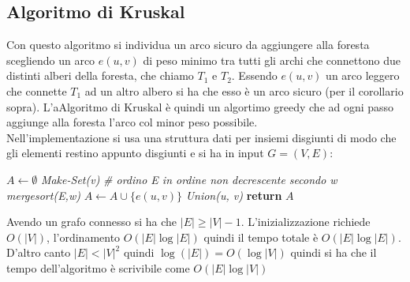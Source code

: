 \documentclass[a4paper,12pt, oneside]{book}
\begin{document}
\subsection{Algoritmo di Kruskal}
Con questo algoritmo si individua un arco sicuro da aggiungere alla
foresta scegliendo un arco $e(u,v)$ di peso minimo tra tutti gli archi
che connettono due distinti alberi della foresta, che chiamo $T_1$ e
$T_2$. Essendo $e(u,v)$ un arco leggero che connette $T_1$ ad un altro
albero si ha che esso è un arco sicuro (per il corollario
sopra). L'aAlgoritmo di Kruskal è quindi un algortimo greedy che ad
ogni passo aggiunge alla foresta l'arco col minor peso
possibile.\\
Nell'implementazione si usa una struttura dati per insiemi
disgiunti di modo che gli elementi restino appunto disgiunti e si ha
in input $G=(V,E)$:
\begin{algorithm}
  \begin{algorithmic}
    \State $A\gets \emptyset$
    \State \textit{Make-Set(v)}
    \EndFor
    \State \textit{\# ordino E in ordine non decrescente secondo w}
    \State \textit{mergesort(E,w)}
    \State $A\gets A\cup\{e(u,v)\}$
    \State \textit{Union(u, v)}
    \EndIf
    \EndFor
    \State \textbf{return} $A$
    \EndFunction
  \end{algorithmic}
\end{algorithm}
Avendo un grafo connesso si ha che $|E|\geq |V|-1$. L'inizializzazione
richiede $O(|V|)$, l'ordinamento $O(|E|\log |E|)$ quindi il tempo
totale è $O(|E|\log |E|)$. D'altro canto $|E|<|V|^2$ quindi $\log
(|E|)=O(\log |V|)$ quindi si ha che il tempo dell'algoritmo è
scrivibile come $O(|E|\log |V|)$ 
\end{document}
